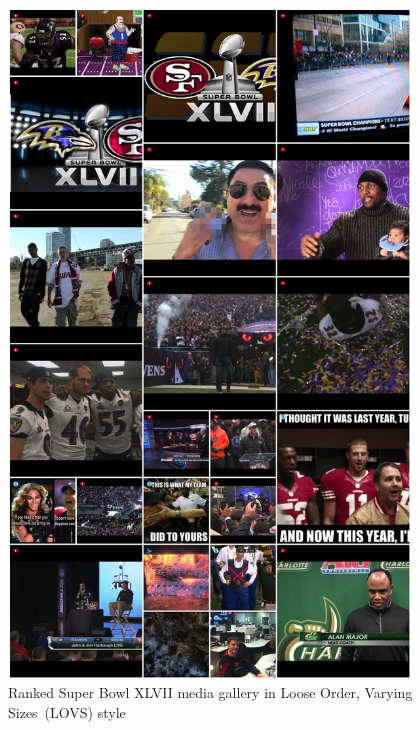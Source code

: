 \begin{figure}[!ht]
  \centering
  \includegraphics[width=0.95\textwidth,height=0.88\textheight,keepaspectratio]{loose_order.png}
  \caption[Ranked Super Bowl media gallery in Loose Order, Varying Sizes style]
  {Ranked Super Bowl XLVII media gallery in Loose Order, Varying Sizes~(LOVS) style}
  \label{fig:loose_order}
\end{figure}

